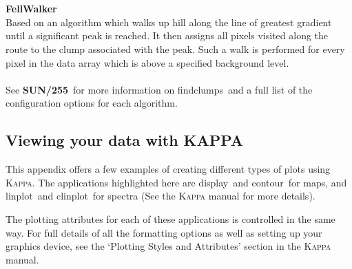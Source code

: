 \documentclass[twoside,11pt]{article}
\newcommand{\xref}[3]{#1}
\newcommand{\xlabel}[1]{}
\renewcommand{\_}{\texttt{\symbol{95}}}
\newcommand{\Kappa}{\xref{\textsc{Kappa}}{sun95}{}}
\newcommand{\task}[1]{\textsf{#1}}
\newcommand{\clinplot}{\xref{\task{clinplot}}{sun95}{CLINPLOT}}
\newcommand{\contour}{\xref{\task{contour}}{sun95}{CONTOUR}}
\newcommand{\display}{\xref{\task{display}}{sun95}{DISPLAY}}
\newcommand{\linplot}{\xref{\task{linplot}}{sun95}{LINPLOT}}
\newcommand{\findclumps}{\xref{\task{findclumps}}{sun255}{FINDCLUMPS}}
\newcommand{\cupidsun}{\xref{\textbf{SUN/255}}{sun255}{}}
\begin{document}
\\\\
\textbf{FellWalker}\\
Based on an algorithm which walks up hill along the line of greatest gradient until a significant peak is reached. It then assigns all pixels visited along the route to the clump associated with the peak. Such a walk is performed for every pixel in the data array which is above a specified background level. 
\\\\
See \cupidsun\ for more information on \findclumps\ and a full list of the configuration options for each algorithm.


\newpage
\subsection{\xlabel{display}Viewing your data with KAPPA}
\label{app:display}
This appendix offers a few examples of creating different types of plots using \Kappa. The applications highlighted here are \display\ and \contour\ for maps, and \linplot\ and \clinplot\ for spectra (See the \xref{\textsc{Kappa} manual}{sun95}{} for more details).

 The plotting attributes for each of these applications is controlled in the same way.  For full details of all the formatting options as well as setting up your graphics device, see the `Plotting Styles and Attributes' section in the \xref{\textsc{Kappa} manual}{sun95}{}.
\end{document}
